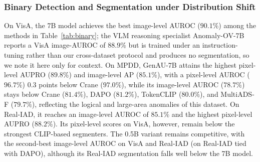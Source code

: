 \subsubsection{Binary Detection and Segmentation under Distribution
Shift}
On VisA, the 7B model achieves the best image-level AUROC ($90.1\%$) among the methods in Table~\ref{tab:binary}; the VLM reasoning specialist Anomaly-OV-7B reports a VisA image-AUROC of $88.9\%$ but is trained under an instruction-tuning rather than our cross-dataset protocol and produces no segmentation, so we note it here only for context. On MPDD, GenAU-7B attains the highest pixel-level AUPRO ($89.8\%$) and image-level AP ($85.1\%$), with a pixel-level AUROC ($96.7\%$) $0.3$ points below Crane ($97.0\%$), while its image-level AUROC ($78.7\%$) stays below Crane ($81.4\%$), DAPO ($81.2\%$), TokenCLIP ($80.0\%$), and MultiADS-F ($79.7\%$), reflecting the logical and large-area anomalies of this dataset. On Real-IAD, it reaches an image-level AUROC of $85.1\%$ and the highest pixel-level AUPRO ($88.2\%$). Its pixel-level scores on VisA, however, remain below the strongest CLIP-based segmenters. The 0.5B variant remains competitive, with the second-best image-level AUROC on VisA and Real-IAD (on Real-IAD tied with DAPO), although its Real-IAD segmentation falls well below the 7B model.
